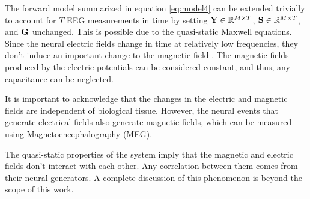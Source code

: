 The forward model summarized in equation \eqref{eq:model4} can be extended trivially to account for $T$ EEG measurements in time by setting $\mathbf{Y} \in \mathbb{R}^{M\times T}$, $\mathbf{S} \in \mathbb{R}^{M\times T}$, and $\mathbf{G}$ unchanged.
%
This is possible due to the quasi-static Maxwell equations. 
%
Since the neural electric fields change in time at relatively low frequencies, they don't induce an important change to the magnetic field \cite{nunez2006electric}.
%
The magnetic fields produced by the electric potentials can be considered constant, and thus, any capacitance can be neglected.

It is important to acknowledge that the changes in the electric and magnetic fields are independent of biological tissue.
%
However, the neural events that generate electrical fields also generate magnetic fields, which can be measured using Magnetoencephalography (MEG).

The quasi-static properties of the system imply that the magnetic and electric fields don't interact with each other.
%
Any correlation between them comes from their neural generators.
%
A complete discussion of this phenomenon is beyond the scope of this work.


